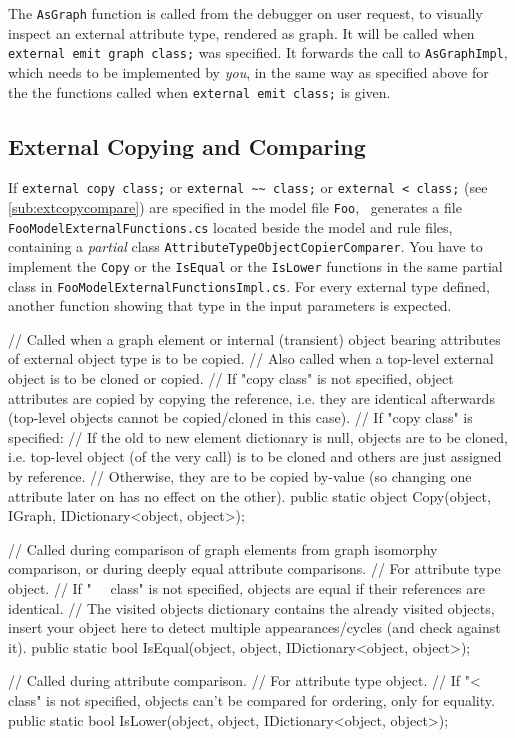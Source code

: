 The \texttt{AsGraph} function is called from the debugger on user request, to visually inspect an external attribute type, rendered as graph.
It will be called when \texttt{external emit graph class;} was specified.
It forwards the call to \texttt{AsGraphImpl}, which needs to be implemented by \emph{you}, in the same way as specified above for the the functions called when \texttt{external emit class;} is given.

\subsection*{External Copying and Comparing}\label{sub:apiextcopycompare}

If \texttt{external copy class;} or \texttt{external \textasciitilde\textasciitilde\ class;} or \texttt{external < class;} (see \ref{sub:extcopycompare}) are specified in the model file \texttt{Foo},
\GrG~generates a file \texttt{Foo\-Model\-External\-Functions.cs} located beside the model and rule files,
containing a \emph{partial} class \texttt{Attribute\-Type\-Object\-Copier\-Comparer}.
You have to implement the \texttt{Copy} or the \texttt{IsEqual} or the \texttt{IsLower} functions in the same partial class in \texttt{Foo\-Model\-External\-Functions\-Impl.cs}.
For every external type defined, another function showing that type in the input parameters is expected.

\begin{csharplet}
// Called when a graph element or internal (transient) object bearing attributes of external object type is to be copied.
// Also called when a top-level external object is to be cloned or copied.
// If "copy class" is not specified, object attributes are copied by copying the reference, i.e. they are identical afterwards (top-level objects cannot be copied/cloned in this case).
// If "copy class" is specified:
// If the old to new element dictionary is null, objects are to be cloned, i.e. top-level object (of the very call) is to be cloned and others are just assigned by reference.
// Otherwise, they are to be copied by-value (so changing one attribute later on has no effect on the other).
public static object Copy(object, IGraph, IDictionary<object, object>);

// Called during comparison of graph elements from graph isomorphy comparison, or during deeply equal attribute comparisons.
// For attribute type object.
// If "~~ class" is not specified, objects are equal if their references are identical.
// The visited objects dictionary contains the already visited objects, insert your object here to detect multiple appearances/cycles (and check against it).
public static bool IsEqual(object, object, IDictionary<object, object>);

// Called during attribute comparison.
// For attribute type object.
// If "< class" is not specified, objects can't be compared for ordering, only for equality.
public static bool IsLower(object, object, IDictionary<object, object>);
\end{csharplet}

